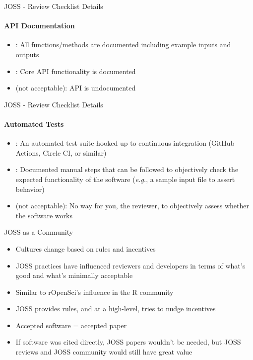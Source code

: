 \begin{frame}{JOSS - Review Checklist Details}
\framesubtitle{API Documentation}

\begin{itemize}
        \item {}: All functions/methods are documented
including example inputs and outputs
\item {}: Core API functionality is documented
\item {} (not acceptable): API is undocumented
\end{itemize}
    
\end{frame}

\begin{frame}{JOSS - Review Checklist Details}
\framesubtitle{Automated Tests}

\begin{itemize}
        \item {}: An automated test suite hooked up to
continuous integration (GitHub Actions, Circle CI,
or similar)
\item {}: Documented manual steps that can be
followed to objectively check the expected
functionality of the software (\emph{e.g.}, a sample input
file to assert behavior)
\item {} (not acceptable):  No way for you, the
reviewer, to objectively assess whether the
software works
\end{itemize}
    
\end{frame}

\begin{frame}{JOSS as a Community}
    \begin{itemize}
        \item Cultures change based on rules and incentives
        \item JOSS practices have influenced reviewers and
developers in terms of what's good and what's
minimally acceptable
\item Similar to rOpenSci's influence in the R community
\item JOSS provides rules, and at a high-level, tries to
nudge incentives
\item Accepted software = accepted paper
\item If software was cited directly, JOSS papers wouldn't
be needed, but JOSS reviews and JOSS
community would still have great value
    \end{itemize}
\end{frame}


